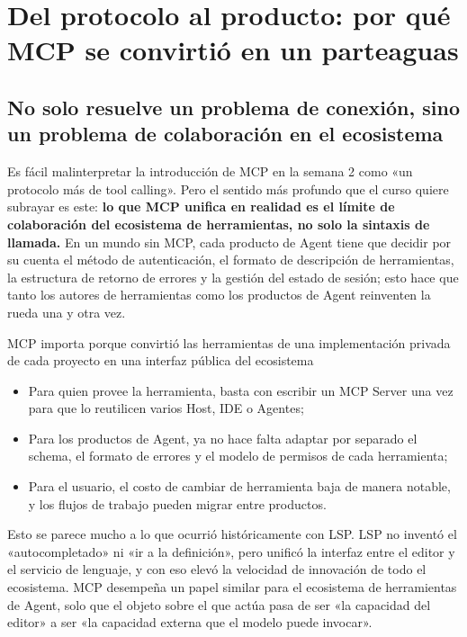 \section{Del protocolo al producto: por qué MCP se convirtió en un parteaguas}

\subsection{No solo resuelve un problema de conexión, sino un problema de colaboración en el ecosistema}
Es fácil malinterpretar la introducción de MCP en la semana 2 como «un protocolo más de tool calling». Pero el sentido más profundo que el curso quiere subrayar es este: \textbf{lo que MCP unifica en realidad es el límite de colaboración del ecosistema de herramientas, no solo la sintaxis de llamada.} En un mundo sin MCP, cada producto de Agent tiene que decidir por su cuenta el método de autenticación, el formato de descripción de herramientas, la estructura de retorno de errores y la gestión del estado de sesión; esto hace que tanto los autores de herramientas como los productos de Agent reinventen la rueda una y otra vez.

\begin{importantbox}{MCP importa porque convirtió las herramientas de una implementación privada de cada proyecto en una interfaz pública del ecosistema}
\begin{itemize}
    \item Para quien provee la herramienta, basta con escribir un MCP Server una vez para que lo reutilicen varios Host, IDE o Agentes;
    \item Para los productos de Agent, ya no hace falta adaptar por separado el schema, el formato de errores y el modelo de permisos de cada herramienta;
    \item Para el usuario, el costo de cambiar de herramienta baja de manera notable, y los flujos de trabajo pueden migrar entre productos.
\end{itemize}
\end{importantbox}

Esto se parece mucho a lo que ocurrió históricamente con LSP. LSP no inventó el «autocompletado» ni «ir a la definición», pero unificó la interfaz entre el editor y el servicio de lenguaje, y con eso elevó la velocidad de innovación de todo el ecosistema. MCP desempeña un papel similar para el ecosistema de herramientas de Agent, solo que el objeto sobre el que actúa pasa de ser «la capacidad del editor» a ser «la capacidad externa que el modelo puede invocar».

